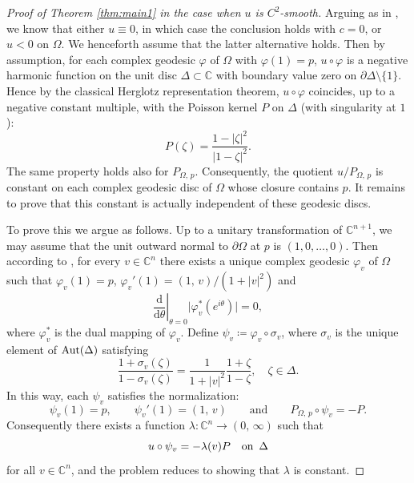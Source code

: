 \documentclass[12pt,a4paper]{amsart}
\numberwithin{equation}{section}
\theoremstyle{definition}
\newcommand{\dd}{\mathrm d}
\begin{document}
\begin{proof}[Proof of Theorem \ref{thm:main1} in the case when $u$ is $C^2$-smooth]
Arguing as in \cite{Bracci-Trans09}, we know that either $u\equiv0$, in which case the conclusion holds with $c=0$, or $u<0$ on $\Omega$. We henceforth assume that the latter alternative holds. Then by assumption, for each complex geodesic $\varphi$ of $\Omega$ with $\varphi(1)=p$, $u\circ\varphi$ is a negative harmonic function on the unit disc $\Delta\subset\mathbb C$ with boundary value zero on $\partial\Delta \!\setminus\! \{1\}$. Hence by the classical Herglotz representation theorem, $u\circ\varphi$ coincides, up to a negative constant multiple, with the Poisson kernel $P$ on $\Delta$ (with singularity at $1$):
  $$
  P(\zeta)=\frac{1-|\zeta|^2}{|1-\zeta|^2}.
  $$
The same property holds also for $P_{\Omega,\, p}$. Consequently, the quotient $u/P_{\Omega,\, p}$ is constant on each complex geodesic disc of $\Omega$ whose closure contains $p$. It remains to prove that this constant is actually independent of these geodesic discs.

To prove this we argue as follows. Up to a unitary transformation of $\mathbb C^{n+1}$, we may assume that the unit outward normal to $\partial\Omega$ at $p$ is $(1, 0,\ldots, 0)$. Then according to
\cite[Theorem 1.1]{Huang-Wang22}, for every $v\in\mathbb C^n$ there exists a unique complex geodesic $\varphi_v$ of $\Omega$ such that $\varphi_v(1)=p$, $\varphi_v'(1)=(1,\, v)/(1+|v|^2)$ and
\[
 \left.\frac{\dd}{\dd\theta}\right|_{\theta=0} \bigl|\varphi^{\ast}_v(e^{i\theta})\bigr|=0,
\]
where $\varphi^{\ast}_v$ is the dual mapping of $\varphi_{v}$. Define $\psi_v\coloneqq \varphi_v\circ\sigma_v$, where $\sigma_v$ is the unique element of ${\rm Aut}(\Delta)$ satisfying
\[
 \frac{1+\sigma_v(\zeta)}{1-\sigma_v(\zeta)}=\frac{1}{1+|v|^2}\frac{1+\zeta}{1-\zeta}, \quad \zeta\in\Delta.
\]
In this way, each $\psi_v$ satisfies the normalization:
\[
 \psi_v(1)=p,\qquad \psi_v'(1)=(1,\, v)\qquad \text{and} \qquad P_{\Omega,\, p}\circ\psi_v=-P.
\]
Consequently there exists a function $\lambda\!:\mathbb C^n\to(0,\, \infty)$ such that
\[
 u\circ\psi_v=-\lambda(v)P \quad {\rm on }\ \, \Delta
\]
for all $v\in\mathbb C^n$, and the problem reduces to showing that $\lambda$ is constant.


\end{proof}
\end{document}

